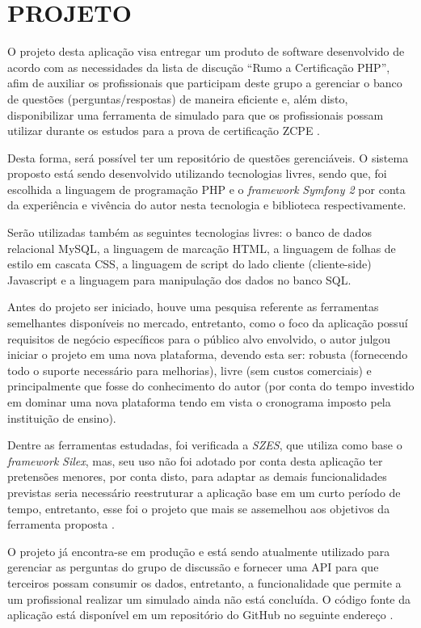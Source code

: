 \chapter{PROJETO}
\label{chp:projeto}
 
O projeto desta aplicação visa entregar um produto de software
desenvolvido de acordo com as necessidades da lista de discução ``Rumo a
Certificação PHP'', afim de auxiliar os profissionais que participam deste
grupo a gerenciar o banco de questões (perguntas/respostas) de maneira eficiente e,
além disto, disponibilizar uma ferramenta de simulado para que os profissionais 
possam utilizar durante os estudos para a prova de certificação \acs{ZCPE}
\cite{googleGroupsRumoACertificaoPHP}.

Desta forma, será possível ter um repositório de questões gerenciáveis. O
sistema proposto está sendo desenvolvido utilizando tecnologias livres, sendo 
que, foi escolhida a linguagem de programação \acs{PHP} e o
\textit{framework} \textit{Symfony 2} por conta da experiência e vivência do
autor nesta tecnologia e biblioteca respectivamente.

Serão utilizadas também as seguintes tecnologias livres: o banco de dados
relacional MySQL, a linguagem de marcação HTML, a linguagem de folhas de estilo 
em cascata CSS,  a linguagem de script do lado cliente (cliente-side) Javascript 
e a linguagem para manipulação dos dados no banco SQL.

Antes do projeto ser iniciado, houve uma pesquisa referente as ferramentas
semelhantes disponíveis no mercado, entretanto, como o foco da aplicação possuí
requisitos de negócio específicos para o público alvo envolvido, o autor julgou
iniciar o projeto em uma nova plataforma, devendo esta ser: robusta (fornecendo
todo o suporte necessário para melhorias), livre (sem custos comerciais) e
principalmente que fosse do conhecimento do autor (por conta do tempo investido
em dominar uma nova plataforma tendo em vista o cronograma imposto pela
instituição de ensino).

Dentre as ferramentas estudadas, foi
verificada a \textit{SZES}, que utiliza como base o \textit{framework}
\textit{Silex}, mas, seu uso não foi adotado por conta desta aplicação
ter pretensões menores, por conta disto, para adaptar as demais funcionalidades
previstas seria necessário reestruturar a aplicação
base em um curto período de tempo, entretanto, esse foi o projeto que mais se
assemelhou aos objetivos da ferramenta proposta \cite{githubSZES}.

O projeto já encontra-se em produção e está sendo atualmente utilizado para 
gerenciar as perguntas do grupo de discussão e fornecer uma \ac{API} para que 
terceiros possam consumir os dados, entretanto, a funcionalidade que permite a
um profissional realizar um simulado ainda não está concluída. O código fonte da
aplicação está disponível em um repositório do GitHub no seguinte endereço 
\cite{githubZCPE}.

